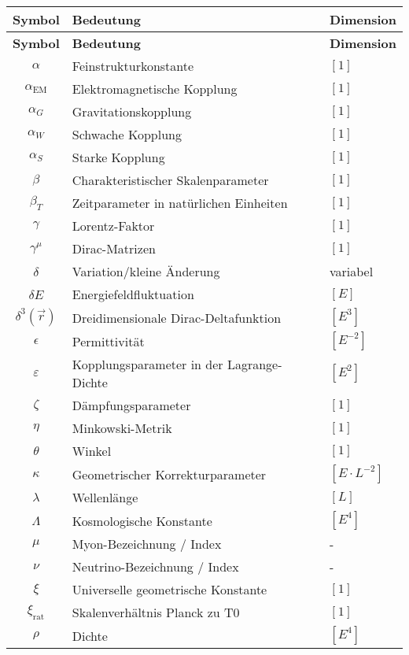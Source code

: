 \documentclass[12pt,a4paper]{report}
\begin{document}
	\begin{longtable}{|c|l|l|}
		\hline
		\textbf{Symbol} & \textbf{Bedeutung} & \textbf{Dimension} \\
		\hline
		\endfirsthead
		\hline
		\textbf{Symbol} & \textbf{Bedeutung} & \textbf{Dimension} \\
		\hline
		\endhead
		
		$\alpha$ & Feinstrukturkonstante & $[1]$ \\
		$\alpha_{\text{EM}}$ & Elektromagnetische Kopplung & $[1]$ \\
		$\alpha_G$ & Gravitationskopplung & $[1]$ \\
		$\alpha_W$ & Schwache Kopplung & $[1]$ \\
		$\alpha_S$ & Starke Kopplung & $[1]$ \\
		$\beta$ & Charakteristischer Skalenparameter & $[1]$ \\
		$\beta_T$ & Zeitparameter in natürlichen Einheiten & $[1]$ \\
		$\gamma$ & Lorentz-Faktor & $[1]$ \\
		$\gamma^\mu$ & Dirac-Matrizen & $[1]$ \\
		$\delta$ & Variation/kleine Änderung & variabel \\
		$\delta E$ & Energiefeldfluktuation & $[E]$ \\
		$\delta^3(\vec{r})$ & Dreidimensionale Dirac-Deltafunktion & $[E^3]$ \\
		$\epsilon$ & Permittivität & $[E^{-2}]$ \\
		$\varepsilon$ & Kopplungsparameter in der Lagrange-Dichte & $[E^2]$ \\
		$\zeta$ & Dämpfungsparameter & $[1]$ \\
		$\eta$ & Minkowski-Metrik & $[1]$ \\
		$\theta$ & Winkel & $[1]$ \\
		$\kappa$ & Geometrischer Korrekturparameter & $[E \cdot L^{-2}]$ \\
		$\lambda$ & Wellenlänge & $[L]$ \\
		$\Lambda$ & Kosmologische Konstante & $[E^4]$ \\
		$\mu$ & Myon-Bezeichnung / Index & - \\
		$\nu$ & Neutrino-Bezeichnung / Index & - \\
		$\xi$ & Universelle geometrische Konstante & $[1]$ \\
		$\xi_{\text{rat}}$ & Skalenverhältnis Planck zu T0 & $[1]$ \\
		$\rho$ & Dichte & $[E^4]$ \\

\end{longtable}
\end{document}
